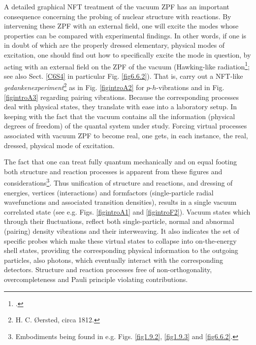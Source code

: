A detailed graphical NFT treatment of the vacuum ZPF has an important consequence concerning the probing of nuclear structure with reactions. By intervening these ZPF with an external field, one will excite the modes whose properties can be  compared with experimental findings.
\FloatBarrier
In other words, if one is in doubt of which are the properly dressed elementary, physical modes of excitation, one should find out how to specifically excite the  mode in question, by acting with an external field on the ZPF of the vacuum (Hawking-like radiation\footnote{\cite{Barranco:19b}.}; see also Sect. \ref{C6S4} in particular Fig. \ref{fig6.6.2}). That is,  carry out a NFT-like \textit{gedankenexperiment}\footnote{H. C. \O{}ersted, circa 1812.} as in Fig. \ref{figintroA2} for $p$-$h$-vibrations and in Fig. \ref{figintroA3} regarding pairing vibrations. Because the corresponding processes deal  with physical states, they translate with ease into a laboratory setup. In keeping with the fact that the vacuum contains all the information (physical degrees of freedom) of the quantal system under study. Forcing virtual processes associated  with vacuum ZPF to become real, one   gets, in each instance, the real, dressed, physical mode of excitation. 

The fact that one can treat fully quantum mechanically and on equal footing both structure and reaction processes is apparent from these figures and considerations\footnote{Embodiments being found in e.g. Figs. \ref{fig1.9.2}, \ref{fig1.9.3} and  \ref{fig6.6.2}.}. Thus unification of structure and reactions, and dressing of energies, vertices (interactions) and formfactors (single-particle radial wavefunctions and associated transition densities), results in a single vacuum correlated state (see e.g. Figs. \ref{figintroA1} and \ref{figintroF2}). Vacuum states which through their fluctuations, reflect both single-particle, normal and abnormal (pairing) density vibrations and their interweaving.  It also indicates the  set of specific probes which make  these virtual states to collapse into on-the-energy shell states, providing the corresponding physical information to the   outgoing particles, also photons, which eventually interact with the corresponding detectors. Structure and reaction processes free of non-orthogonality, overcompleteness and Pauli principle violating contributions.




